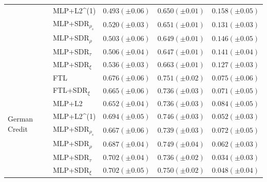 \begin{tabular}{lllll}
 & MLP+L2^{(1)} & $0.493 (\pm0.06)$ & $0.650 (\pm0.01)$ & $0.158 (\pm0.05)$ \\
 & MLP+SDR$_{\rho_s}$ & $0.520 (\pm0.03)$ & $0.651 (\pm0.01)$ & $0.131 (\pm0.03)$ \\
 & MLP+SDR$_{\rho}$ & $0.503 (\pm0.06)$ & $0.649 (\pm0.01)$ & $0.146 (\pm0.05)$ \\
 & MLP+SDR$_{\tau}$ & $0.506 (\pm0.04)$ & $0.647 (\pm0.01)$ & $0.141 (\pm0.04)$ \\
 & MLP+SDR$_{\xi}$ & $0.536 (\pm0.03)$ & $0.663 (\pm0.01)$ & $0.127 (\pm0.03)$ \\
\cline{1-5}
\multirow[t]{8}{*}{German Credit} & FTL & $0.676 (\pm0.06)$ & $0.751 (\pm0.02)$ & $0.075 (\pm0.06)$ \\
 & FTL+SDR$_{\xi}$ & $0.665 (\pm0.06)$ & $0.736 (\pm0.03)$ & $0.071 (\pm0.05)$ \\
 & MLP+L2 & $0.652 (\pm0.04)$ & $0.736 (\pm0.03)$ & $0.084 (\pm0.05)$ \\
 & MLP+L2^{(1)} & $0.694 (\pm0.05)$ & $0.746 (\pm0.03)$ & $0.052 (\pm0.03)$ \\
 & MLP+SDR$_{\rho_s}$ & $0.667 (\pm0.06)$ & $0.739 (\pm0.03)$ & $0.072 (\pm0.05)$ \\
 & MLP+SDR$_{\rho}$ & $0.687 (\pm0.04)$ & $0.749 (\pm0.04)$ & $0.062 (\pm0.03)$ \\
 & MLP+SDR$_{\tau}$ & $0.702 (\pm0.04)$ & $0.736 (\pm0.02)$ & $0.034 (\pm0.03)$ \\
 & MLP+SDR$_{\xi}$ & $0.702 (\pm0.05)$ & $0.750 (\pm0.02)$ & $0.048 (\pm0.04)$ \\
\cline{1-5}
\bottomrule
\end{tabular}
